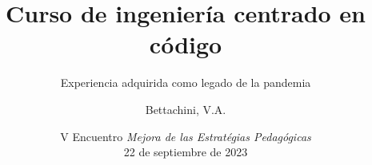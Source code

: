 \documentclass[aspectratio=43]{beamer}
\begin{document}
\title{Curso de ingeniería centrado en código}
\subtitle{Experiencia adquirida como legado de la pandemia}
\author[vbettachini@unlam.edu.ar]{Bettachini, V.A.}
\date[2023-09-22]{
	V Encuentro \emph{Mejora de las Estratégias Pedagógicas}\\22 de septiembre de 2023
}


\begin{frame} 
  \titlepage
\end{frame}

\end{document}
